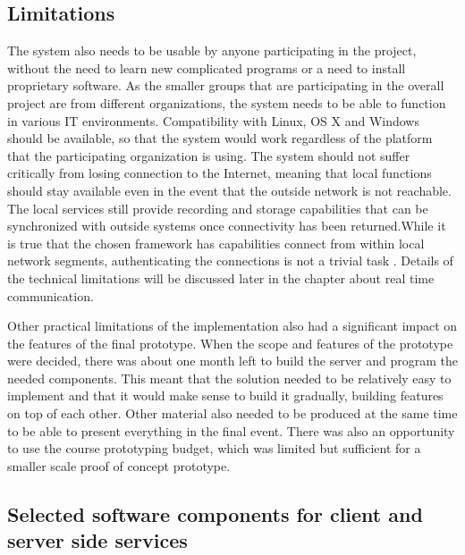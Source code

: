 \documentclass[english,12pt,a4paper,dvips]{article}
\begin{document}
\subsection{Limitations}


The system also needs to be usable by anyone participating in the project, without the need to learn new complicated programs or a need to install proprietary software. As the smaller groups that are participating in the overall project are from different organizations, the system needs to be able to function in various IT environments. Compatibility with Linux, OS X and Windows should be available, so that the system would work regardless of the platform that the participating organization is using. The system should not suffer critically from losing connection to the Internet, meaning that local functions should stay available even in the event that the outside network is not reachable. The local services still provide recording and storage capabilities that can be synchronized with outside systems once connectivity has been returned.While it is true that the chosen framework has capabilities connect from within local network segments, authenticating the connections is not a trivial task \cite{Johnston}. Details of the technical limitations will be discussed later in the chapter about real time communication.

Other practical limitations of the implementation also had a significant impact on the features of the final prototype. When the scope and features of the prototype were decided, there was about one month left to build the server and program the needed components. This meant that the solution needed to be relatively easy to implement and that it would make sense to build it gradually, building features on top of each other. Other material also needed to be produced at the same time to be able to present everything in the final event. There was also an opportunity to use the course prototyping budget, which was limited but sufficient for a smaller scale proof of concept prototype.

\subsection{Selected software components for client and server side services}
\end{document}
